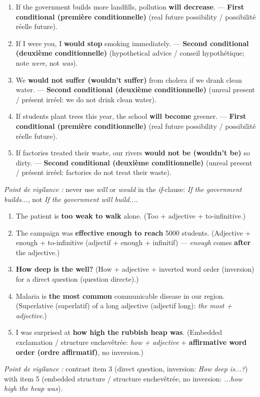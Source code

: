 \documentclass[11pt]{article}
\newcommand{\cle}[1]{{\popxbold\color{popdark}#1}}
\begin{document}
\begin{corrige}
\begin{enumerate}
\item If the government builds more landfills, pollution \textbf{will decrease}. --- \textbf{First conditional (première conditionnelle)} (real future possibility / possibilité réelle future).
\item If I were you, I \textbf{would stop} smoking immediately. --- \textbf{Second conditional (deuxième conditionnelle)} (hypothetical advice / conseil hypothétique; note \emph{were}, not \emph{was}).
\item We \textbf{would not suffer (wouldn't suffer)} from cholera if we drank clean water. --- \textbf{Second conditional (deuxième conditionnelle)} (unreal present / présent irréel: we do not drink clean water).
\item If students plant trees this year, the school \textbf{will become} greener. --- \textbf{First conditional (première conditionnelle)} (real future possibility / possibilité réelle future).
\item If factories treated their waste, our rivers \textbf{would not be (wouldn't be)} so dirty. --- \textbf{Second conditional (deuxième conditionnelle)} (unreal present / présent irréel: factories do not treat their waste).
\end{enumerate}
\emph{Point de vigilance :} never use \emph{will} or \emph{would} in the \emph{if}-clause: \emph{If the government builds...}, not \emph{If the government will build...}.
\end{corrige}

\begin{corrige}
\begin{enumerate}
\item The patient is \textbf{too weak to walk} alone. (\cle{Too + adjective + to-infinitive}.)
\item The campaign was \textbf{effective enough to reach} 5000 students. (\cle{Adjective + enough + to-infinitive (adjectif + enough + infinitif)} --- \emph{enough} comes \textbf{after} the adjective.)
\item \textbf{How deep is the well?} (\cle{How + adjective} + \cle{inverted word order (inversion)} for a \cle{direct question (question directe)}.)
\item Malaria is \textbf{the most common} communicable disease in our region. (\cle{Superlative (superlatif)} of a \cle{long adjective (adjectif long)}: \emph{the most + adjective}.)
\item I was surprised at \textbf{how high the rubbish heap was}. (Embedded exclamation / structure enchevêtrée: \emph{how + adjective} + \textbf{affirmative word order (ordre affirmatif)}, no inversion.)
\end{enumerate}
\emph{Point de vigilance :} contrast item 3 (direct question, inversion: \emph{How deep is...?}) with item 5 (embedded structure / structure enchevêtrée, no inversion: \emph{...how high the heap was}).
\end{corrige}
\end{document}
